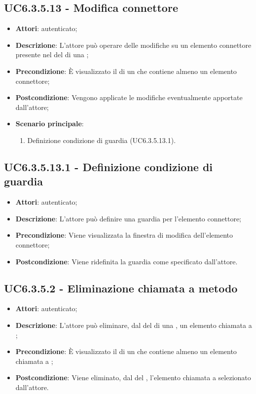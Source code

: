 \subsection{UC6.3.5.13 - Modifica connettore}
\label{ssec:UC6.3.5.13}
\begin{itemize}
\item \textbf{Attori}:  autenticato;
\item \textbf{Descrizione}: L'attore può operare delle modifiche su un elemento connettore presente nel  del  di una ;
\item \textbf{Precondizione}: È visualizzato il  di un  che contiene almeno un elemento connettore;
\item \textbf{Postcondizione}: Vengono applicate le modifiche eventualmente apportate dall'attore;
\item \textbf{Scenario principale}: \begin{enumerate}\item Definizione condizione di guardia (UC6.3.5.13.1).
 \end{enumerate}
\end{itemize}
\subsection{UC6.3.5.13.1 - Definizione condizione di guardia}
\label{ssec:UC6.3.5.13.1}
\begin{itemize}
\item \textbf{Attori}:  autenticato;
\item \textbf{Descrizione}: L'attore può definire una guardia per l'elemento connettore;
\item \textbf{Precondizione}: Viene visualizzata la finestra di modifica dell'elemento connettore;
\item \textbf{Postcondizione}: Viene ridefinita la guardia come specificato dall'attore.
\end{itemize}
\subsection{UC6.3.5.2 - Eliminazione chiamata a metodo}
\label{ssec:UC6.3.5.2}
\begin{itemize}
\item \textbf{Attori}:  autenticato;
\item \textbf{Descrizione}: L'attore può eliminare, dal  del  di una , un elemento chiamata a ;
\item \textbf{Precondizione}: È visualizzato il  di un  che contiene almeno un elemento chiamata a ;
\item \textbf{Postcondizione}: Viene eliminato, dal  del ,  l'elemento chiamata a  selezionato dall'attore.
\end{itemize}
